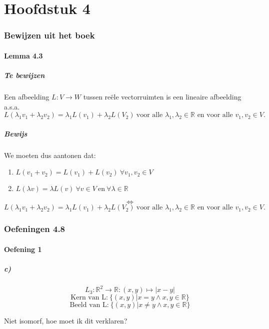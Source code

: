 \documentclass[lineaire_algebra_oplossingen.tex]{subfiles}
\begin{document}
\part{Hoofdstuk 4}
\section{Bewijzen uit het boek}
\subsection{Lemma 4.3}
\subsubsection*{Te bewijzen}
Een afbeelding $L:V\rightarrow W$ tussen re\"ele vectorruimten is een lineaire afbeelding a.s.a.
$$L(\lambda_1v_1+\lambda_2v_2) = \lambda_1L(v_1)+\lambda_2L(V_2)\ \text{voor alle $\lambda_1,\lambda_2 \in \mathbb{R}$ en voor alle $v_1,v_2 \in V$}.$$
\subsubsection*{Bewijs}
We moeten dus aantonen dat:
\begin{enumerate}
\item $L(v_1+v_2) = L(v_1) + L(v_2) \ \forall v_1,v_2 \in V$
\item $L(\lambda v) = \lambda L(v) \ \forall v \in V \ \text{en} \ \forall \lambda \in \mathbb{R}$
\end{enumerate}
$$\Leftrightarrow$$
$$L(\lambda_1v_1+\lambda_2v_2) = \lambda_1L(v_1)+\lambda_2L(V_2)\ \text{voor alle $\lambda_1,\lambda_2 \in \mathbb{R}$ en voor alle $v_1,v_2 \in V$}.$$


\section{Oefeningen 4.8}
\subsection{Oefening 1}
\subsubsection{c)}
$$
L_3:\mathbb{R}^2\rightarrow\mathbb{R}:(x,y)\mapsto |x-y|
$$
$$
\text{Kern van L:} \ \{(x,y)|x=y \wedge x,y \in \mathbb{R} \}
$$
$$
\text{Beeld van L:} \ \{(x,y)|x\neq y \wedge x,y \in \mathbb{R} \}
$$
\begin{center}
Niet isomorf, hoe moet ik dit verklaren?
\end{center}
\end{document}
